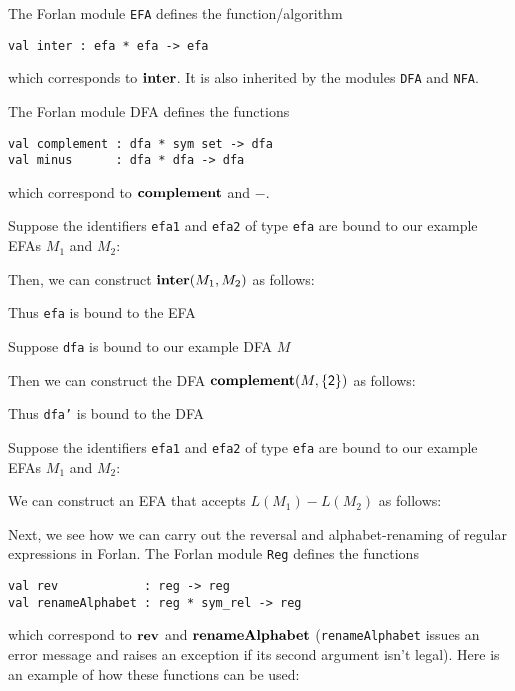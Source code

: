 The Forlan module \texttt{EFA} defines the function/algorithm
\begin{verbatim}
val inter : efa * efa -> efa
\end{verbatim}
which corresponds to $\mathbf{inter}$.  It is also inherited by the
modules \texttt{DFA} and \texttt{NFA}.

The Forlan module DFA defines the functions
\begin{verbatim}
val complement : dfa * sym set -> dfa
val minus      : dfa * dfa -> dfa
\end{verbatim}
which correspond to $\mathbf{complement}$ and $\minus$.

Suppose the identifiers \texttt{efa1} and \texttt{efa2} of type \texttt{efa}
are bound to our example EFAs $M_1$ and $M_2$:
\begin{center}

\end{center}
Then, we can construct $\mathbf{inter}(M_1,M_2)$ as follows:

Thus \texttt{efa} is bound to the EFA
\begin{center}

\end{center}

Suppose \texttt{dfa} is bound to our example DFA $M$
\begin{center}

\end{center}
Then we can construct the DFA $\mathbf{complement}(M,\{\mathsf{2}\})$
as follows:

Thus \texttt{dfa'} is bound to the DFA
\begin{center}

\end{center}

Suppose the identifiers \texttt{efa1} and \texttt{efa2} of type \texttt{efa}
are bound to our example EFAs $M_1$ and $M_2$:
\begin{center}

\end{center}
We can construct an EFA that accepts $L(M_1)-L(M_2)$ as follows:


Next, we see how we can carry out the reversal and alphabet-renaming
of regular expressions in Forlan.  The Forlan module \texttt{Reg}
defines the functions
\begin{verbatim}
val rev            : reg -> reg
val renameAlphabet : reg * sym_rel -> reg
\end{verbatim}
%
%
which correspond to $\mathbf{rev}$ and $\mathbf{renameAlphabet}$
%
%
%
%
(\texttt{renameAlphabet} issues an error message and raises
an exception if its second argument isn't legal).
Here is an example of how these functions can be used:



